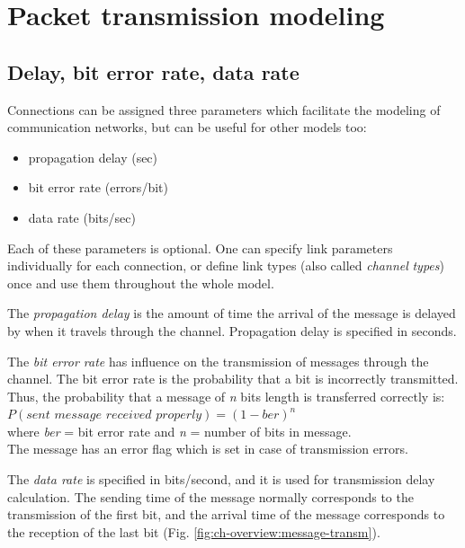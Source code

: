 \section{Packet transmission modeling}
\label{ch:simple-modules:packet-transmission}

\subsection{Delay, bit error rate, data rate}

Connections can be assigned three parameters which facilitate
the modeling of communication networks, but can be useful for
other models too:
\begin{itemize}
  \item{propagation delay (sec)}
  \item{bit error rate (errors/bit)}
  \item{data rate (bits/sec)}
\end{itemize}


Each of these parameters is optional. One can specify link parameters
individually for each connection, or define link types (also
called \textit{channel} \textit{types}) once and use them throughout the
whole model.

The \textit{propagation delay} is the amount of time the arrival of
the message is delayed by when it travels through the channel.
Propagation delay is specified in seconds.

The \textit{bit error rate} has influence on the transmission of messages
through the channel. The bit error rate is the probability that
a bit is incorrectly transmitted. Thus, the probability that
a message of \textit{n} bits length is transferred correctly is:\\


$P( \textit{sent message received properly} ) = (1 - \textit{ber})^{\mathit{n}}$\\
where \textit{ber} = bit error rate and \textit{n} = number of bits in message.\\


The message has an error flag which is set in case of transmission
errors.

The \textit{data rate} is specified in bits/second, and it is used
for transmission delay calculation. The sending time of the message
normally corresponds to the transmission of the first bit, and
the arrival time of the message corresponds to the reception
of the last bit (Fig. \ref{fig:ch-overview:message-transm}).

